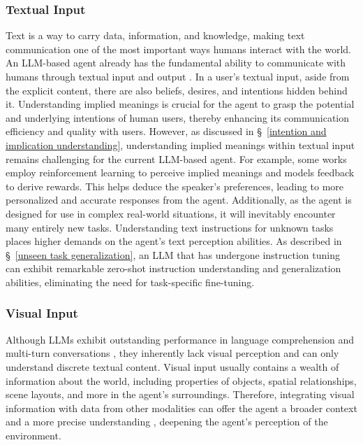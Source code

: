 \subsubsection{Textual Input} \label{sec:Textual Input}
Text is a way to carry data, information, and knowledge, making text communication one of the most important ways humans interact with the world. An LLM-based agent already has the fundamental ability to communicate with humans through textual input and output \cite{gravitasauto}. In a user's textual input, aside from the explicit content, there are also beliefs, desires, and intentions hidden behind it. Understanding implied meanings is crucial for the agent to grasp the potential and underlying intentions of human users, thereby enhancing its communication efficiency and quality with users. However, as discussed in \S \  \ref{intention and implication understanding}, understanding implied meanings within textual input remains challenging for the current LLM-based agent. For example, some works
\cite{DBLP:conf/acl/LinFKD22,DBLP:conf/nips/ChristianoLBMLA17,DBLP:conf/hri/BasuSD18,DBLP:conf/aaai/SumersHHNG21} employ reinforcement learning to perceive implied meanings and models feedback to derive rewards. This helps deduce the speaker's preferences, leading to more personalized and accurate responses from the agent. Additionally, as the agent is designed for use in complex real-world situations, it will inevitably encounter many entirely new tasks. Understanding text instructions for unknown tasks places higher demands on the agent's text perception abilities. As described in \S \ \ref{unseen task generalization}, an LLM that has undergone instruction tuning \cite{DBLP:conf/iclr/WeiBZGYLDDL22} can exhibit remarkable zero-shot instruction understanding and generalization abilities, eliminating the need for task-specific fine-tuning.

\subsubsection{Visual Input}\label{sec:Visual Input}
Although LLMs exhibit outstanding performance in language comprehension \cite{DBLP:journals/corr/abs-2303-08774,chatgpt2022} and multi-turn conversations \cite{DBLP:conf/sigir/LuR0LX20}, they inherently lack visual perception and can only understand discrete textual content. Visual input usually contains a wealth of information about the world, including properties of objects, spatial relationships, scene layouts, and more in the agent's surroundings. Therefore, integrating visual information with data from other modalities can offer the agent a broader context and a more precise understanding \cite{DBLP:conf/icml/DriessXSLCIWTVY23}, deepening the agent's perception of the environment.

